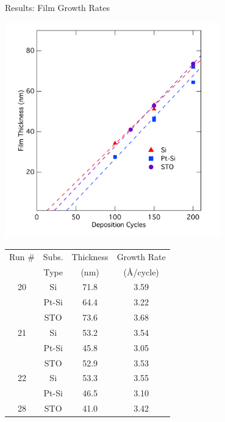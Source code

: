 \documentclass[professionalfont]{beamer}
\begin{document}
\begin{frame}{Results: Film Growth Rates}
\begin{overprint}
	\centerline{\includegraphics[width=0.7\textwidth]{./graphics/data/ellipsometry/Ellip-Rates}}
	\vspace*{0.5cm}
	\begin{center}
	\begin{tabular}{cccc}
	\toprule
	Run \#	&Subs. 	&Thickness 	&Growth Rate 	\\ 
			&Type	&(nm)		&(\AA/cycle) 	\\ \midrule%
	20		&Si		&71.8		&3.59		\\
			&Pt-Si	&64.4		&3.22		\\
			&STO	&73.6		&3.68		\\
	21		&Si		&53.2		&3.54		\\
			&Pt-Si	&45.8		&3.05		\\
			&STO	&52.9		&3.53		\\
	22		&Si		&53.3		&3.55		\\
			&Pt-Si	&46.5		&3.10		\\
	28		&STO	&41.0		&3.42		\\				
	\bottomrule
	\end{tabular}
	\end{center}
	\vfill
\end{overprint}
\end{frame}
\end{document}
